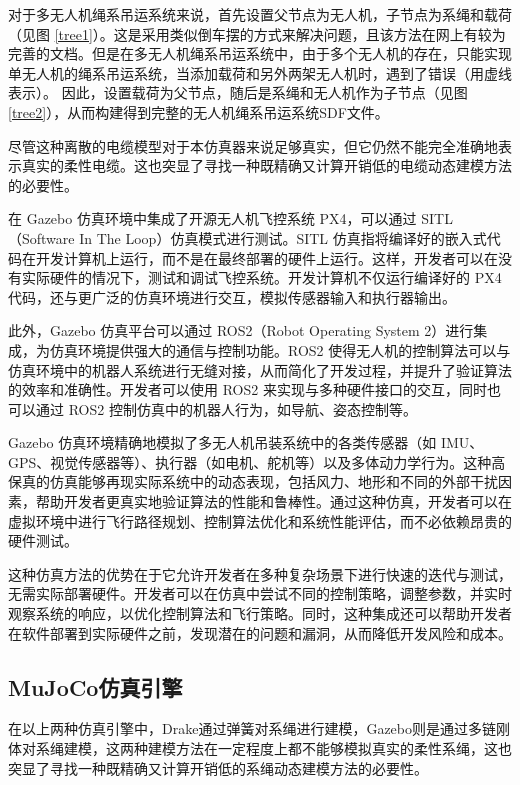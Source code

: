 \documentclass[lang=chs, degree=master, blindreview=false, winfonts=true]{yanputhesis}
\begin{document}
对于多无人机绳系吊运系统来说，首先设置父节点为无人机，子节点为系绳和载荷（见图 \ref{tree1}）。这是采用类似倒车摆的方式来解决问题，且该方法在网上有较为完善的文档。但是在多无人机绳系吊运系统中，由于多个无人机的存在，只能实现单无人机的绳系吊运系统，当添加载荷和另外两架无人机时，遇到了错误（用虚线表示）。
因此，设置载荷为父节点，随后是系绳和无人机作为子节点（见图 \ref{tree2}），从而构建得到完整的无人机绳系吊运系统SDF文件。

尽管这种离散的电缆模型对于本仿真器来说足够真实，但它仍然不能完全准确地表示真实的柔性电缆。这也突显了寻找一种既精确又计算开销低的电缆动态建模方法的必要性。

在 Gazebo 仿真环境中集成了开源无人机飞控系统 PX4，可以通过 SITL（Software In The Loop）仿真模式进行测试。SITL 仿真指将编译好的嵌入式代码在开发计算机上运行，而不是在最终部署的硬件上运行。这样，开发者可以在没有实际硬件的情况下，测试和调试飞控系统。开发计算机不仅运行编译好的 PX4 代码，还与更广泛的仿真环境进行交互，模拟传感器输入和执行器输出。

此外，Gazebo 仿真平台可以通过 ROS2（Robot Operating System 2）进行集成，为仿真环境提供强大的通信与控制功能。ROS2 使得无人机的控制算法可以与仿真环境中的机器人系统进行无缝对接，从而简化了开发过程，并提升了验证算法的效率和准确性。开发者可以使用 ROS2 来实现与多种硬件接口的交互，同时也可以通过 ROS2 控制仿真中的机器人行为，如导航、姿态控制等。

Gazebo 仿真环境精确地模拟了多无人机吊装系统中的各类传感器（如 IMU、GPS、视觉传感器等）、执行器（如电机、舵机等）以及多体动力学行为。这种高保真的仿真能够再现实际系统中的动态表现，包括风力、地形和不同的外部干扰因素，帮助开发者更真实地验证算法的性能和鲁棒性。通过这种仿真，开发者可以在虚拟环境中进行飞行路径规划、控制算法优化和系统性能评估，而不必依赖昂贵的硬件测试。

这种仿真方法的优势在于它允许开发者在多种复杂场景下进行快速的迭代与测试，无需实际部署硬件。开发者可以在仿真中尝试不同的控制策略，调整参数，并实时观察系统的响应，以优化控制算法和飞行策略。同时，这种集成还可以帮助开发者在软件部署到实际硬件之前，发现潜在的问题和漏洞，从而降低开发风险和成本。

\subsection{MuJoCo仿真引擎}

在以上两种仿真引擎中，Drake通过弹簧对系绳进行建模，Gazebo则是通过多链刚体对系绳建模，这两种建模方法在一定程度上都不能够模拟真实的柔性系绳，这也突显了寻找一种既精确又计算开销低的系绳动态建模方法的必要性。
\end{document}
